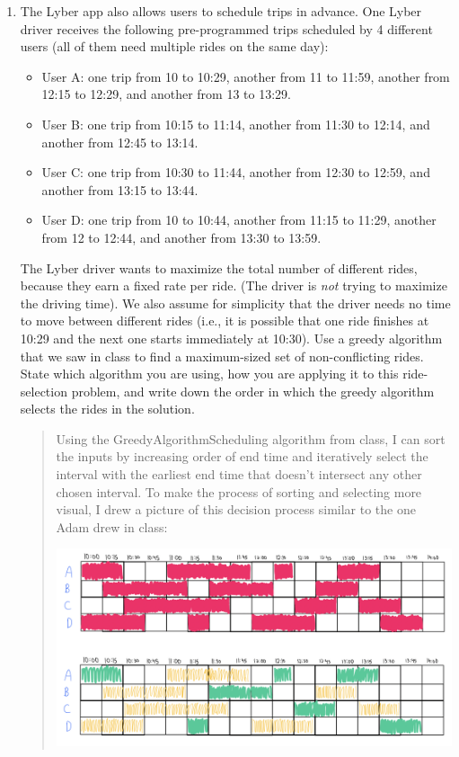 \documentclass[11pt]{article}
\begin{document}
\begin{enumerate}
\begin{enumerate}
    \item The Lyber app also allows users to schedule trips in advance. One Lyber driver receives the following pre-programmed trips scheduled by 4 different users (all of them need multiple rides on the same day):
    \begin{itemize}
        \item User A: one trip from 10 to 10:29, another from 11 to 11:59, another from 12:15 to 12:29, and another from 13 to 13:29.
        \item User B: one trip from 10:15 to 11:14, another from 11:30 to 12:14, and another from 12:45 to 13:14.
        \item User C: one trip from 10:30 to 11:44, another from 12:30 to 12:59, and another from 13:15 to 13:44.
        \item User D: one trip from 10 to 10:44, another from 11:15 to 11:29, another from 12 to 12:44, and another from 13:30 to 13:59.
    \end{itemize}
    The Lyber driver wants to maximize the total number of different rides, because they earn a fixed rate per ride. (The driver is \textit{not} trying to maximize the driving time). 
    We also assume for simplicity that the driver needs no time to move between different rides (i.e., it is possible that one ride finishes at 10:29 and the next one starts immediately at 10:30). 
    Use a greedy algorithm that we saw in class to find a maximum-sized set of non-conflicting rides.  State which algorithm you are using, how you are applying it to this ride-selection problem, and write down the order in which the greedy algorithm selects the rides in the solution. 

    \begin{quote}
        \color{purple}
        Using the GreedyAlgorithmScheduling algorithm from class, I can sort the inputs by increasing order of end time and iteratively select the interval with the earliest end time that doesn't intersect any other chosen interval. To make the process of sorting and selecting more visual, I drew a picture of this decision process similar to the one Adam drew in class: \newline 

    \hspace*{-1.25in}
    \includegraphics[scale=0.4]{q1d.png}


\end{quote}
\end{enumerate}
\end{enumerate}
\end{document}
